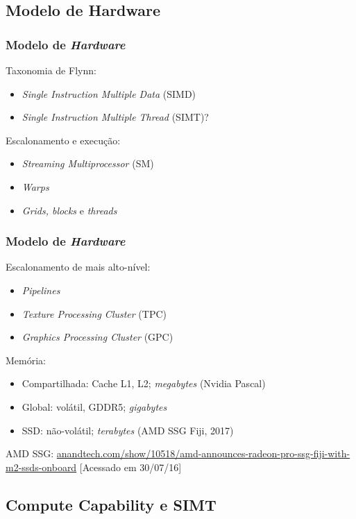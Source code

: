 \documentclass[10pt, compress]{beamer}
\begin{document}
\subsection{Modelo de Hardware}

\begin{frame}
    \frametitle{Modelo de \textit{Hardware}}
    Taxonomia de Flynn:
    \begin{itemize}
        \item \textit{Single Instruction Multiple Data} (SIMD)
        \item \textit{Single Instruction Multiple Thread} (SIMT)?
    \end{itemize}
    Escalonamento e execução:
    \begin{itemize}
        \item \textit{Streaming Multiprocessor} (SM)
        \item \textit{Warps}
        \item \textit{Grids, blocks} e \textit{threads}
    \end{itemize}
\end{frame}

\begin{frame}
    \frametitle{Modelo de \textit{Hardware}}
    Escalonamento de mais alto-nível:
    \begin{itemize}
        \item \textit{Pipelines}
        \item \textit{Texture Processing Cluster} (TPC)
        \item \textit{Graphics Processing Cluster} (GPC)
    \end{itemize}
    Memória:
    \begin{itemize}
        \item Compartilhada: Cache L1, L2; \textit{megabytes} (Nvidia Pascal)
        \item Global: volátil, GDDR5; \textit{gigabytes}
        \item SSD: \alert{não-volátil}; \alert{\textit{terabytes}} (AMD SSG Fiji, 2017)
    \end{itemize}
    \vfill

    \tiny{AMD SSG: \url{anandtech.com/show/10518/amd-announces-radeon-pro-ssg-fiji-with-m2-ssds-onboard} [Acessado em 30/07/16]}
\end{frame}

\subsection{Compute Capability e SIMT}
\end{document}
